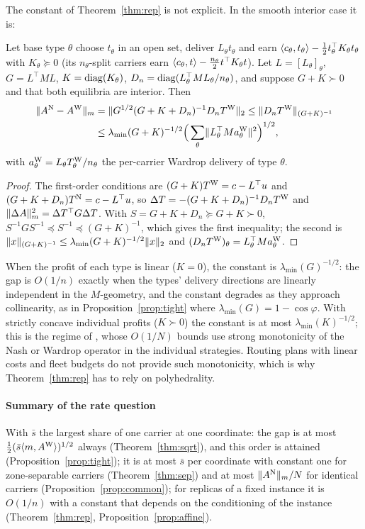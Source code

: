 The constant of Theorem~\ref{thm:rep} is not explicit. In the smooth interior case it is:

\begin{proposition}\label{prop:affine}
Let base type $\theta$ choose $t_\theta$ in an open set, deliver $L_\theta t_\theta$ and earn $\langle c_\theta,t_\theta\rangle-\tfrac12t_\theta^\top K_\theta t_\theta$ with $K_\theta\succeq0$ (its $n_\theta$-split carriers earn $\langle c_\theta,t\rangle-\tfrac{n_\theta}{2}t^\top K_\theta t$). Let $L=[L_\theta]_\theta$, $G=L^\top ML$, $K=\operatorname{diag}(K_\theta)$, $D_n=\operatorname{diag}(L_\theta^\top ML_\theta/n_\theta)$, and suppose $G+K\succ0$ and that both equilibria are interior. Then
\[
\begin{aligned}
\lVert A^{\mathrm{N}}-A^{\mathrm{W}}\rVert_m&=\lVert G^{1/2}(G+K+D_n)^{-1}D_nT^{\mathrm{W}}\rVert_2\le\lVert D_nT^{\mathrm{W}}\rVert_{(G+K)^{-1}}\\
&\le\lambda_{\min}(G+K)^{-1/2}\Big(\sum_\theta\lVert L_\theta^\top Ma_\theta^{\mathrm{W}}\rVert^2\Big)^{1/2},
\end{aligned}
\]
with $a_\theta^{\mathrm{W}}=L_\theta T^{\mathrm{W}}_\theta/n_\theta$ the per-carrier Wardrop delivery of type $\theta$.
\end{proposition}
\begin{proof}
The first-order conditions are $(G+K)T^{\mathrm{W}}=c-L^\top u$ and $(G+K+D_n)T^{\mathrm{N}}=c-L^\top u$, so $\Delta T=-(G+K+D_n)^{-1}D_nT^{\mathrm{W}}$ and $\lVert \Delta A\rVert_m^2=\Delta T^\top G\Delta T$. With $S=G+K+D_n\succeq G+K\succ0$, $S^{-1}GS^{-1}\preceq S^{-1}\preceq(G+K)^{-1}$, which gives the first inequality; the second is $\lVert x\rVert_{(G+K)^{-1}}\le\lambda_{\min}(G+K)^{-1/2}\lVert x\rVert_2$ and $(D_nT^{\mathrm{W}})_\theta=L_\theta^\top Ma_\theta^{\mathrm{W}}$.
\end{proof}

When the profit of each type is linear ($K=0$), the constant is $\lambda_{\min}(G)^{-1/2}$: the gap is $O(1/n)$ exactly when the types' delivery directions are linearly independent in the $M$-geometry, and the constant degrades as they approach collinearity, as in Proposition~\ref{prop:tight} where $\lambda_{\min}(G)=1-\cos\varphi$. With strictly concave individual profits ($K\succ0$) the constant is at most $\lambda_{\min}(K)^{-1/2}$; this is the regime of \citet[Thm.~1(1)--(2)]{Paccagnan2019}, whose $O(1/N)$ bounds use strong monotonicity of the Nash or Wardrop operator in the individual strategies. Routing plans with linear costs and fleet budgets do not provide such monotonicity, which is why Theorem~\ref{thm:rep} has to rely on polyhedrality.

\paragraph{Summary of the rate question} With $\bar s$ the largest share of one carrier at one coordinate: the gap is at most $\tfrac12(\bar s\langle m,A^{\mathrm{W}}\rangle)^{1/2}$ always (Theorem~\ref{thm:sqrt}), and this order is attained (Proposition~\ref{prop:tight}); it is at most $\bar s$ per coordinate with constant one for zone-separable carriers (Theorem~\ref{thm:sep}) and at most $\lVert A^{\mathrm{N}}\rVert_m/N$ for identical carriers (Proposition~\ref{prop:common}); for replicas of a fixed instance it is $O(1/n)$ with a constant that depends on the conditioning of the instance (Theorem~\ref{thm:rep}, Proposition~\ref{prop:affine}).
